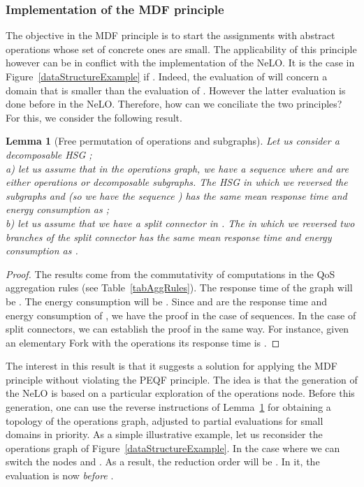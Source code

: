\documentclass[a4paper]{article}
\newtheorem{lemma}{Lemma}
\begin{document}
\subsubsection{Implementation of the MDF principle}

The objective in the MDF principle is to start the assignments with abstract operations whose set of 
concrete ones are small. The applicability of this principle however can be in conflict with the implementation 
of the NeLO. It is the case in Figure~\ref{dataStructureExample} 
if . Indeed, the evaluation of  will concern a domain that is smaller than the 
evaluation of . However the latter evaluation is done before in the NeLO. Therefore, how can we 
conciliate the two principles? For this, we consider the following result. 

\begin{lemma}[Free permutation of operations and subgraphs]\label{freePermutation}
Let us consider a decomposable HSG ; \\ a) let us assume that in  the operations graph, we have a sequence   where  and  are either 
operations or decomposable subgraphs. The HSG  in which we reversed the subgraphs  and 
 (so we have the sequence ) has the same mean response time and energy consumption as ; \\ b) let us assume that 
we have a split connector  in . The  in which we reversed two branches of the split connector 
has the same mean response time and energy consumption as . 
\end{lemma}

\begin{proof}
The results come from the commutativity of computations in the QoS aggregation rules (see Table~\ref{tabAggRules}). 
The response time of the graph  will be . The energy consumption will be 
. Since  and  are the response time and energy consumption of 
, we have the proof in the case of sequences. In the case of split connectors, we can establish the 
proof in the same way. For instance, given an elementary Fork with the operations  its response time 
is .
\end{proof}

The interest in this result is that it suggests a solution for applying the MDF principle 
without violating the PEQF principle. The idea is that the generation of the NeLO is based on a particular 
exploration of the operations node. Before this generation, one can use the reverse instructions of Lemma~\ref{freePermutation} 
for obtaining a topology of the operations graph, adjusted to  partial evaluations for  
small domains in priority.  
As a simple illustrative example, let us reconsider the operations graph of Figure~\ref{dataStructureExample}. 
In the case where  we can switch the nodes  and 
. As a result, the reduction order will be . In it, 
the evaluation  is now {\it before} .
\end{document}
